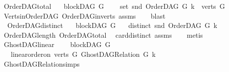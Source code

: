 \begin{isabellebody}
\isanewline
%
\endisadelimproof
\isanewline
{}\isamarkupfalse%
\ OrderDAG{\isacharunderscore}{\kern0pt}total{\isacharcolon}{\kern0pt}\isanewline
\ \ \ {\isachardoublequoteopen}blockDAG\ G{\isachardoublequoteclose}\ \isanewline
\ \ \ {\isachardoublequoteopen}set\ {\isacharparenleft}{\kern0pt}snd\ {\isacharparenleft}{\kern0pt}OrderDAG\ G\ k{\isacharparenright}{\kern0pt}{\isacharparenright}{\kern0pt}\ {\isacharequal}{\kern0pt}\ verts\ G{\isachardoublequoteclose}\isanewline
%
\isadelimproof
\ \ %
\endisadelimproof
%
\isatagproof
{}\isamarkupfalse%
\ Verts{\isacharunderscore}{\kern0pt}in{\isacharunderscore}{\kern0pt}OrderDAG\ OrderDAG{\isacharunderscore}{\kern0pt}in{\isacharunderscore}{\kern0pt}verts\ assms{\isacharparenleft}{\kern0pt}{}{\isacharparenright}{\kern0pt}\isanewline
\ \ \isamarkupfalse%
\ blast%
\endisatagproof
{\isafoldproof}%
%
\isadelimproof
\ \isanewline
%
\endisadelimproof
\ \ \ \ \ \isanewline
{}\isamarkupfalse%
\ \ OrderDAG{\isacharunderscore}{\kern0pt}distinct{\isacharcolon}{\kern0pt}\isanewline
\ \ \ {\isachardoublequoteopen}blockDAG\ G{\isachardoublequoteclose}\isanewline
\ \ \ {\isachardoublequoteopen}distinct\ {\isacharparenleft}{\kern0pt}snd\ {\isacharparenleft}{\kern0pt}OrderDAG\ G\ k{\isacharparenright}{\kern0pt}{\isacharparenright}{\kern0pt}{\isachardoublequoteclose}\isanewline
%
\isadelimproof
\ \ %
\endisadelimproof
%
\isatagproof
{}\isamarkupfalse%
\ OrderDAG{\isacharunderscore}{\kern0pt}length\ OrderDAG{\isacharunderscore}{\kern0pt}total\isanewline
\ \ card{\isacharunderscore}{\kern0pt}distinct\ assms\isanewline
\ \ \isamarkupfalse%
\ metis%
\endisatagproof
{\isafoldproof}%
%
\isadelimproof
\ \isanewline
%
\endisadelimproof
\isanewline
\isanewline
{}\isamarkupfalse%
\ GhostDAG{\isacharunderscore}{\kern0pt}linear{\isacharcolon}{\kern0pt}\ \isanewline
\ \ \ {\isachardoublequoteopen}blockDAG\ G{\isachardoublequoteclose}\ \isanewline
\ \ \ {\isachardoublequoteopen}linear{\isacharunderscore}{\kern0pt}order{\isacharunderscore}{\kern0pt}on\ {\isacharparenleft}{\kern0pt}verts\ G{\isacharparenright}{\kern0pt}\ {\isacharparenleft}{\kern0pt}GhostDAG{\isacharunderscore}{\kern0pt}Relation\ G\ k{\isacharparenright}{\kern0pt}{\isachardoublequoteclose}\isanewline
%
\isadelimproof
\ \ %
\endisadelimproof
%
\isatagproof
{}\isamarkupfalse%
\ GhostDAG{\isacharunderscore}{\kern0pt}Relation{\isachardot}{\kern0pt}simps\ \isanewline

\end{isabellebody}
